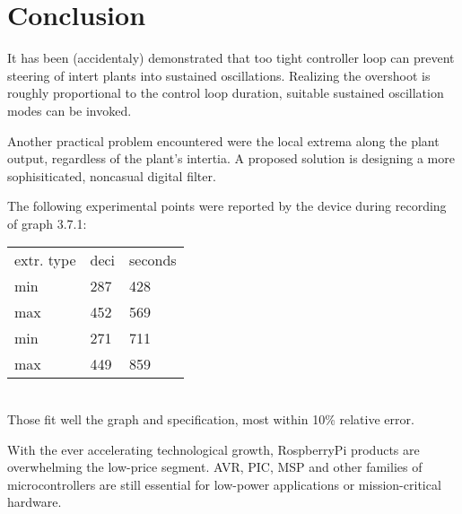 \section{Conclusion}
It has been (accidentaly) demonstrated that too tight controller loop can prevent steering of intert plants into sustained oscillations.
Realizing the overshoot is roughly proportional to the control loop duration, suitable sustained oscillation modes can be invoked.
\par
Another practical problem encountered were the local extrema along the plant output, regardless of the plant's intertia.
A proposed solution is designing a more sophisiticated, noncasual digital filter.
\par
The following experimental points were reported by the device during recording of graph 3.7.1:
\\
\begin{tabular}{p{3cm} | p{3cm} | p{3cm}}
extr. type & deci & seconds  \\
min        & 287  & 428      \\
max        & 452  & 569      \\
min        & 271  & 711      \\
max        & 449  & 859
\end{tabular}
\\
Those fit well the graph and specification, most within 10\% relative error.
\par
With the ever accelerating technological growth, RospberryPi products are overwhelming the low-price segment.
AVR, PIC, MSP and other families of microcontrollers are still essential for low-power applications or mission-critical hardware.

